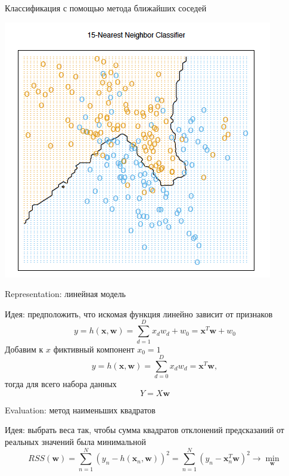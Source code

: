 \documentclass[aspectratio=169]{beamer}
\begin{document}
\begin{frame}{Классификация с помощью метода ближайших соседей}

\begin{center}
\includegraphics[height = 0.6\textheight]{images/knn_cls.png}
\end{center}

\end{frame}

\begin{frame}{Representation: линейная модель}

Идея: предположить, что искомая функция линейно зависит от признаков
\[
y = h(\mathbf{x}, \mathbf{w}) = \sum_{d=1}^D x_d w_d + w_0 = \mathbf{x}^T \mathbf{w} + w_0
\]
Добавим к $x$ фиктивный компонент $x_0 = 1$
\[
y = h(\mathbf{x}, \mathbf{w}) = \sum_{d=0}^D x_d w_d = \mathbf{x}^T \mathbf{w},
\]
тогда для всего набора данных
\[
Y = X \mathbf{w}
\]

\end{frame}

\begin{frame}{Evaluation: метод наименьших квадратов}

Идея: выбрать веса так, чтобы сумма квадратов отклонений предсказаний от реальных значений была минимальной
\[
RSS(\mathbf{w}) = \sum_{n=1}^N (y_n - h(\mathbf{x}_n, \mathbf{w}))^2 = \sum_{n=1}^N (y_n - \mathbf{x}_n^T \mathbf{w})^2 \rightarrow \min_{\mathbf{w}}
\]

\end{frame}
\end{document}
